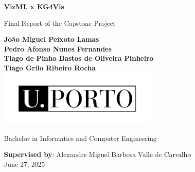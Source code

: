 \documentclass[10pt]{article}
\begin{document}
\pagestyle{fancy}
\fancyhf{}
\fancyfoot[C]{\thepage }

\begin{titlepage}
	\begin{center}
		\vspace*{1cm}
		
    {\fontsize{20.74}{16}\selectfont \textbf{VizML x KG4Vis}}
     
		
		\vspace{0.5cm}
		Final Report of the Capstone Project
		
		\vspace{1.5cm}
		
		\textbf{João Miguel Peixoto Lamas }\\
		\textbf{Pedro Afonso Nunes Fernandes}\\ %
		\textbf{Tiago de Pinho Bastos de Oliveira Pinheiro	}\\ %
		\textbf{Tiago Grilo Ribeiro Rocha	}\\ %
		
		\vfill
		\includegraphics[width=0.6\textwidth]{UPORTO_fundotransparente}
		
		\vfill
		
	
		
		Bachelor in Informatics and Computer Engineering
		
		\vspace{0.8cm}
		
		\textbf{Supervised by}: Alexandre Miguel Barbosa Valle de Carvalho	\\

\vspace{0.4cm}
		June 27, 2025
		
	\end{center}
\end{titlepage}


\thispagestyle{empty} 
\clearpage

\thispagestyle{empty}
\tableofcontents
\thispagestyle{empty}

 \clearpage

\end{document}
